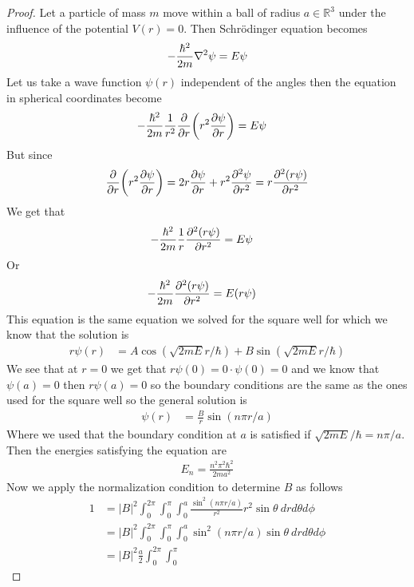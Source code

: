 \documentclass[11pt]{article}
\newcommand{\R}{\mathbb{R}}
\theoremstyle{definition}
\begin{document}
\cleardoublepage
\begin{proof}{2.4}
Let a particle of mass $m$ move within a ball of radius $a \in \R^3$ under the
influence of the potential $V(r) = 0$. Then Schrödinger equation becomes
\begin{align*}
    -\frac{\hbar^2}{2m} \laplacian{\psi} = E\psi
\end{align*}
Let us take a wave function $\psi(r)$ independent of the angles then the
equation in spherical coordinates become
\begin{align*}
    -\frac{\hbar^2}{2m}\frac{1}{r^2}\pdv{r}(r^2\pdv{\psi}{r}) &= E\psi
\end{align*}
But since
\begin{align*}
    \pdv{r}(r^2\pdv{\psi}{r}) = 
    2r\pdv{\psi}{r} + r^2\pdv[2]{\psi}{r}
    = r\pdv[2]{(r\psi)}{r}
\end{align*}
We get that
\begin{align*}
    -\frac{\hbar^2}{2m}\frac{1}{r}\pdv[2]{(r\psi)}{r} &= E\psi
\end{align*}
Or
\begin{align*}
    -\frac{\hbar^2}{2m}\pdv[2]{(r\psi)}{r} &= E(r\psi)
\end{align*}
This equation is the same equation we solved for the square well for which we
know that the solution is 
\begin{align*}
    r\psi(r) &= A\cos(\sqrt{2mE}r/\hbar) + B\sin(\sqrt{2mE}r/\hbar)
\end{align*}
We see that at $r = 0$ we get that $r\psi(0) = 0\cdot\psi(0) = 0$ and we know
that $\psi(a) = 0$ then $r\psi(a) = 0$ so the boundary conditions are the same
as the ones used for the square well so the general solution is
\begin{align*}
    \psi(r) &= \frac{B}{r}\sin(n\pi r/a)
\end{align*}
Where we used that the boundary condition at $a$ is satisfied if 
$\sqrt{2mE}/\hbar = n\pi/a$.
Then the energies satisfying the equation are
\begin{align*}
    E_n = \frac{n^2\pi^2\hbar^2}{2ma^2}
\end{align*}
Now we apply the normalization condition to determine $B$ as follows
\begin{align*}
    1 &= |B|^2\int_0^{2\pi}\int_0^\pi\int_0^a \frac{\sin^2(n\pi r/a)}{r^2}
    r^2\sin\theta~drd\theta d\phi\\
    &= |B|^2\int_0^{2\pi}\int_0^\pi\int_0^a \sin^2(n\pi r/a)
    \sin\theta~drd\theta d\phi\\
    &= |B|^2\frac{a}{2}\int_0^{2\pi}\int_0^\pi

\end{align*}
\end{proof}
\end{document}
